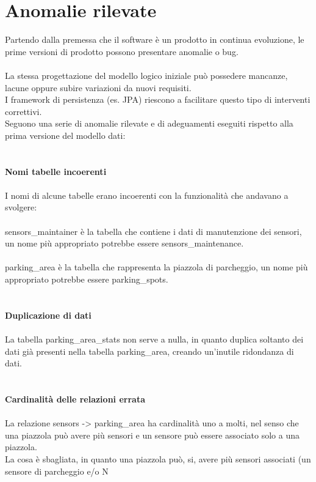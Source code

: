 \section{Anomalie rilevate}
Partendo dalla premessa che il software è un prodotto in continua evoluzione, le prime versioni
di prodotto possono presentare anomalie o bug.
\\\\
La stessa progettazione del modello logico iniziale può possedere mancanze, lacune oppure subire variazioni da nuovi requisiti. 
\\
I framework di persistenza (es. JPA) 
riescono a facilitare questo tipo di interventi correttivi.
\\
Seguono una serie di anomalie rilevate e di adeguamenti eseguiti rispetto alla prima versione del modello dati:
\\\\\\
\textbf{Nomi tabelle incoerenti}
\\\\
I nomi di alcune tabelle erano incoerenti con la funzionalità che andavano a svolgere:
\\\\
sensors\_maintainer è la tabella che contiene i dati di manutenzione dei sensori, un 
nome più appropriato potrebbe essere sensors\_maintenance.
\\\\
parking\_area è la tabella che rappresenta la piazzola di parcheggio, un nome più appropriato
potrebbe essere parking\_spots.
\\\\\\
\clearpage
\leavevmode\newline
\textbf{Duplicazione di dati}
\\\\
La tabella parking\_area\_stats non serve a nulla, in quanto duplica soltanto dei dati già presenti
nella tabella parking\_area, creando un'inutile ridondanza di dati.
\\\\\\
\textbf{Cardinalità delle relazioni errata}
\\\\
La relazione sensors -> parking\_area ha cardinalità uno a molti, nel senso che una piazzola può avere
più sensori e un sensore può essere associato solo a una piazzola. 
\\
La cosa è sbagliata, in quanto una piazzola può, si, avere più sensori associati (un sensore di parcheggio e/o N
